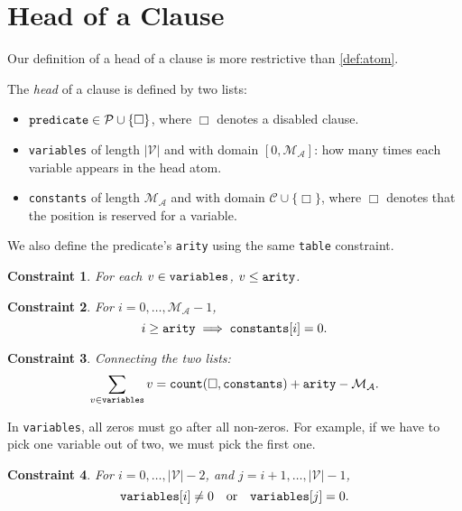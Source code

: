 \documentclass[runningheads]{llncs}
\newtheorem{constraint}{Constraint}
\newcommand{\variable}[1]{\texttt{\textup{#1}}}
\newcommand{\predicates}{\mathcal{P}}
\newcommand{\variables}{\mathcal{V}}
\newcommand{\constants}{\mathcal{C}}
\newcommand{\maxArity}{\mathcal{M}_{\mathcal{A}}}
\begin{document}
\section{Head of a Clause}

Our definition of a head of a clause is more restrictive than \cref{def:atom}.

\begin{definition} %
  The \emph{head} of a clause is defined by two lists:
  \begin{itemize}
  \item $\variable{predicate} \in \predicates \cup \{ \Box \}$, where $\Box$
    denotes a disabled clause.
  \item \variable{variables} of length $|\variables{}|$ and with domain
    $[0, \maxArity{}]$: how many times each variable appears in the head atom.
  \item \variable{constants} of length $\maxArity{}$ and with domain
    $\constants{} \cup \{ \Box \}$, where $\Box$ denotes that the position is
    reserved for a variable.
  \end{itemize}
  We also define the predicate's \variable{arity} using the same
  \variable{table} constraint.
\end{definition}

\begin{constraint}
  For each $v \in \variable{variables}$, $v \le \variable{arity}$.
\end{constraint}

\begin{constraint}
  For $i = 0, \dots, \maxArity{} - 1$,
  \[
    i \ge \variable{arity} \implies \variable{constants}[i] = 0.
  \]
\end{constraint}

\begin{constraint}
  Connecting the two lists:
  \[
    \sum_{v \in \variable{variables}} v = \variable{count}(\Box,
    \variable{constants}) + \variable{arity} - \maxArity{}.
  \]
\end{constraint}

In \variable{variables}, all zeros must go after all non-zeros. For example,
if we have to pick one variable out of two, we must pick the first one.
\begin{constraint}
  For $i = 0, \dots, |\variables{}| - 2$, and $j = i + 1, \dots,
  |\variables{}| - 1$,
  \[
    \variable{variables}[i] \ne 0 \quad \text{or} \quad \variable{variables}[j]
    = 0.
  \]
\end{constraint}
\end{document}
